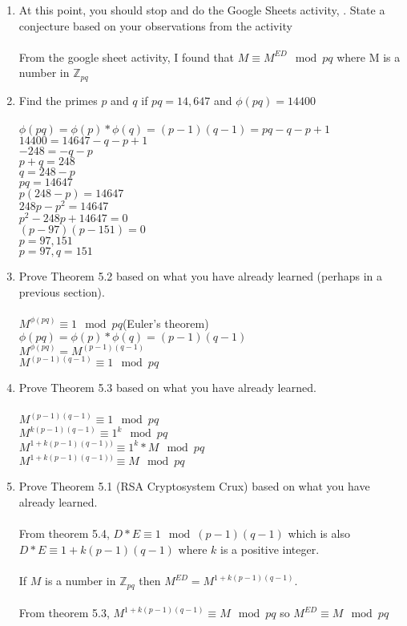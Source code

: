 \documentclass[]{article}
\begin{document}
\begin{enumerate}
    \item At this point, you should stop and do the Google Sheets activity, . State a conjecture based on your observations from the activity
    \\\\From the google sheet activity, I found that $M \equiv M^{ED} \mod pq$ where M is a number in $\mathbb{Z}_{pq}$

    \item Find the primes $p$ and $q$ if $pq=14,647$ and $\phi(pq)=14400$
    \\\\$\phi(pq)=\phi(p)*\phi(q)=(p-1)(q-1)=pq-q-p+1$
    \\$14400=14647-q-p+1$
    \\$-248=-q-p$
    \\$p+q=248$
    \\$q=248-p$
    \\$pq=14647$
    \\$p(248-p)=14647$
    \\$248p-p^2=14647$
    \\$p^2-248p+14647=0$
    \\$(p-97)(p-151)=0$
    \\$p=97,151$
    \\$p=97,q=151$

    \item Prove Theorem 5.2 based on what you have already learned (perhaps in a previous section).
    \\\\$M^{\phi(pq)} \equiv 1 \mod pq$(Euler's theorem) 
    \\$\phi(pq)=\phi(p)*\phi(q)=(p-1)(q-1)$
    \\$M^{\phi(pq)}=M^{(p-1)(q-1)}$
    \\$M^{(p-1)(q-1)} \equiv 1 \mod pq$

    \item Prove Theorem 5.3 based on what you have already learned.
    \\\\$M^{(p-1)(q-1)} \equiv 1 \mod pq$
    \\$M^{k(p-1)(q-1)} \equiv 1^k \mod pq$
    \\$M^{1+k(p-1)(q-1))} \equiv 1^k*M \mod pq$
    \\$M^{1+k(p-1)(q-1))} \equiv M \mod pq$

    \item Prove Theorem 5.1 (RSA Cryptosystem Crux) based on what you have already learned.
    \\\\From theorem 5.4, $D*E \equiv 1 \mod (p-1)(q-1)$ which is also $D*E \equiv 1+k(p-1)(q-1)$ where $k$ is a positive integer. 
    \\\\If $M$ is a number in $\mathbb{Z}_{pq}$ then $M^{ED} = M^{1+k(p-1)(q-1)}$. 
    \\\\From theorem 5.3, $M^{1+k(p-1)(q-1)} \equiv M \mod pq$ so $M^{ED} \equiv M \mod pq$

    
\end{enumerate}
\end{document}
